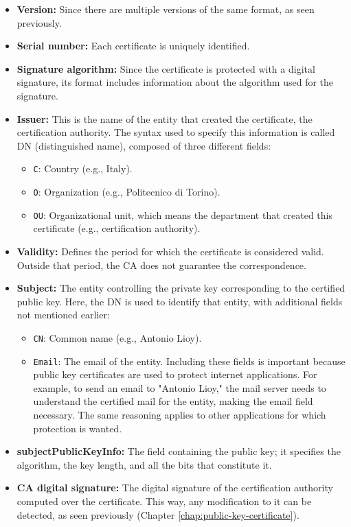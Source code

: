 \begin{itemize}
	\item \textbf{Version:} Since there are multiple versions of the same format, as seen previously.
	\item \textbf{Serial number:} Each certificate is uniquely identified.
	\item \textbf{Signature algorithm:} Since the certificate is protected with a digital signature, its format includes information about the algorithm used for the signature.
	\item \textbf{Issuer:} This is the name of the entity that created the certificate, the certification authority. The syntax used to specify this information is called DN (distinguished name), composed of three different fields:
	      \begin{itemize}
		      \item \texttt{C}: Country (e.g., Italy).
		      \item \texttt{O}: Organization (e.g., Politecnico di Torino).
		      \item \texttt{OU}: Organizational unit, which means the department that created this certificate (e.g., certification authority).
	      \end{itemize}
	\item \textbf{Validity:} Defines the period for which the certificate is considered valid. Outside that period, the CA does not guarantee the correspondence.
	\item \textbf{Subject:} The entity controlling the private key corresponding to the certified public key. Here, the DN is used to identify that entity, with additional fields not mentioned earlier:
	      \begin{itemize}
		      \item \texttt{CN}: Common name (e.g., Antonio Lioy).
		      \item \texttt{Email}: The email of the entity. Including these fields is important because public key certificates are used to protect internet applications. For example, to send an email to "Antonio Lioy," the mail server needs to understand the certified mail for the entity, making the email field necessary. The same reasoning applies to other applications for which protection is wanted.
	      \end{itemize}
	\item \textbf{subjectPublicKeyInfo:} The field containing the public key; it specifies the algorithm, the key length, and all the bits that constitute it.
	\item \textbf{CA digital signature:} The digital signature of the certification authority computed over the certificate. This way, any modification to it can be detected, as seen previously (Chapter \ref{chap:public-key-certificate}).
\end{itemize}

